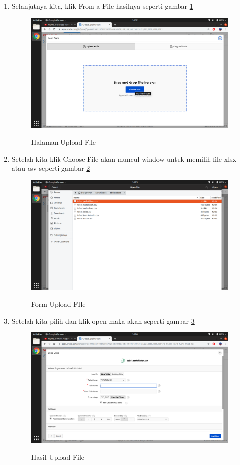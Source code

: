\begin{enumerate}
\item Selanjutnya kita, klik From a File hasilnya seperti gambar \ref{14}
\begin{figure}[H]
\centering
\caption{Halaman Upload File}
\includegraphics[width=1\textwidth]{figures/14}
\label{14}
\end{figure}

\item Setelah kita klik Choose File akan muncul window untuk memilih file xlsx atau csv seperti gambar \ref{3}
\begin{figure}[H]
\centering
\caption{Form Upload FIle}
\includegraphics[width=1\textwidth]{figures/3}
\label{3}
\end{figure}

\item Setelah kita pilih dan klik open maka akan seperti gambar \ref{4}
\begin{figure}[H]
\centering
\caption{Hasil Upload File}
\includegraphics[width=1\textwidth]{figures/4}
\label{4}
\end{figure}


\end{enumerate}

